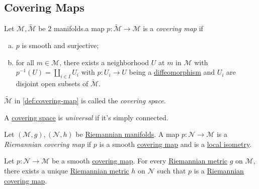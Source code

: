 \subsection{Covering Maps}
\begin{definition}\label{def:covering-map}
	Let \(\mathcal{M} , \widetilde{\mathcal{M}} \) be \(2\) manifolds.a map \(p\colon \widetilde{\mathcal{M}} \to \mathcal{M} \) is a \emph{covering map} if
	\begin{enumerate}[(a)]
		\item \(p\) is smooth and surjective;
		\item for all \(m\in \mathcal{M} \), there exists a neighborhood \(U\) at \(m\) in \(\mathcal{M} \) with \(p ^{-1} (U) = \coprod_{i\in I} U_i\) with \(p\colon U_i \to U\) being a \hyperref[def:diffeomorphism]{diffeomorphism} and \(U_i\) are disjoint open subsets of \(\widetilde{\mathcal{M}} \).
	\end{enumerate}
\end{definition}

\begin{notation}\label{not:covering-space}
	\(\widetilde{\mathcal{M}} \) in \autoref{def:covering-map} is called the \emph{covering space}.
\end{notation}

\begin{notation}\label{not:universal-covering-space}
	A \hyperref[not:covering-space]{covering space} is \emph{universal}	if it's simply connected.
\end{notation}

\begin{definition}\label{def:Riemannian-covering-map}
	Let \((\mathcal{M} , g), (\mathcal{N}, h )\) be \hyperref[def:Riemannian-manifold]{Riemannian manifolds}. A map \(p\colon \mathcal{N} \to \mathcal{M} \) is a \emph{Riemannian covering map} if \(p\) is a smooth \hyperref[def:covering-map]{covering map} and is a \hyperref[def:local-isometry]{local isometry}.
\end{definition}

\begin{proposition}\label{prop:Riemannian-covering-map}
	Let \(p\colon \mathcal{N} \to \mathcal{M} \) be a smooth \hyperref[def:covering-map]{covering map}. For every \hyperref[def:Riemannian-metric]{Riemannian metric} \(g\) on \(\mathcal{M} \), there exists a unique \hyperref[def:Riemannian-metric]{Riemannian metric} \(h\) on \(\mathcal{N} \) such that \(p\) is a \hyperref[def:Riemannian-covering-map]{Riemannian covering map}.
\end{proposition}

